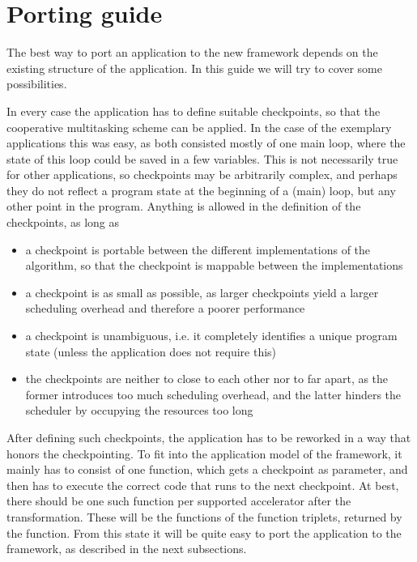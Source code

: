 \section{Porting guide}
\label{Porting}

The best way to port an application to the new framework depends on the existing structure of the application. In this guide we will try to cover some possibilities.

In every case the application has to define suitable checkpoints, so that the cooperative multitasking scheme can be applied. In the case of the exemplary applications this was easy, as both consisted mostly of one main loop, where the state of this loop could be saved in a few variables. This is not necessarily true for other applications, so checkpoints may be arbitrarily complex, and perhaps they do not reflect a program state at the beginning of a (main) loop, but any other point in the program. Anything is allowed in the definition of the checkpoints, as long as
\begin{itemize}
	\item a checkpoint is portable between the different implementations of the algorithm, so that the checkpoint is mappable between the implementations
	\item a checkpoint is as small as possible, as larger checkpoints yield a larger scheduling overhead and therefore a poorer performance
	\item a checkpoint is unambiguous, i.e. it completely identifies a unique program state (unless the application does not require this)
	\item the checkpoints are neither to close to each other nor to far apart, as the former introduces too much scheduling overhead, and the latter hinders the scheduler by occupying the resources too long
\end{itemize}

After defining such checkpoints, the application has to be reworked in a way that honors the checkpointing. To fit into the application model of the framework, it mainly has to consist of one function, which gets a checkpoint as parameter, and then has to execute the correct code that runs to the next checkpoint. At best, there should be one such function per supported accelerator after the transformation. These will be the  functions of the function triplets, returned by the  function. From this state it will be quite easy to port the application to the framework, as described in the next subsections.

